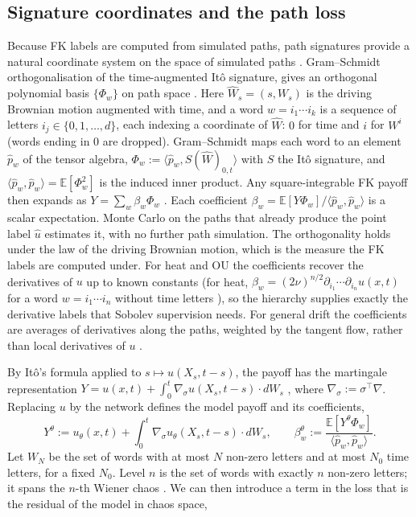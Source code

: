\documentclass[english]{article}
\begin{document}
\subsection{Signature coordinates and the path loss}\label{sec:sig}
Because FK labels are computed from simulated paths, path signatures provide a natural coordinate system on the space of simulated paths \cite{chevyrev2016primer,lyons2024signature}. Gram--Schmidt orthogonalisation of the time-augmented It\^o signature, gives an orthogonal polynomial basis $\{\Phi_w\}$ on path space \cite{chevyrev2026orthogonal}. Here $\hat W_s = (s, W_s)$ is the driving Brownian motion augmented with time, and a word $w = i_1\cdots i_k$ is a sequence of letters $i_j\in\{0,1,\dots,d\}$, each indexing a coordinate of $\hat W$: $0$ for time and $i$ for $W^i$ (words ending in $0$ are dropped). Gram--Schmidt maps each word to an element $\hat p_w$ of the tensor algebra, $\Phi_w := \langle\hat p_w, S(\hat W)_{0,t}\rangle$ with $S$ the It\^o signature, and $\langle\hat p_w,\hat p_w\rangle = \mathbb E[\Phi_w^2]$ is the induced inner product. Any square-integrable FK payoff then expands as $Y = \sum_w \beta_w \Phi_w$ \cite{chevyrev2026orthogonal,nualart2006malliavin}. Each coefficient $\beta_w = \mathbb{E}[Y\Phi_w]/\langle \hat p_w, \hat p_w\rangle$ is a scalar expectation. Monte Carlo on the paths that already produce the point label $\hat u$ estimates it, with no further path simulation. The orthogonality holds under the law of the driving Brownian motion, which is the measure the FK labels are computed under. For heat and OU the coefficients recover the derivatives of $u$ up to known constants (for heat, $\beta_w = (2\nu)^{n/2}\partial_{i_1}\cdots\partial_{i_n}u(x,t)$ for a word $w=i_1\cdots i_n$ without time letters \cite{stroock1987homogeneous}), so the hierarchy supplies exactly the derivative labels that Sobolev supervision needs. For general drift the coefficients are averages of derivatives along the paths, weighted by the tangent flow, rather than local derivatives of $u$ \cite{fournie1999applications}.

By It\^o's formula applied to $s\mapsto u(X_s,t-s)$, the payoff has the martingale representation $Y = u(x,t) + \int_0^t\nabla_\sigma u(X_s,t-s)\cdot dW_s$ \cite{pardoux1990adapted}, where $\nabla_\sigma := \sigma^\top\nabla$. Replacing $u$ by the network defines the model payoff and its coefficients,
\begin{equation}\label{eq:ytheta}
  Y^\theta := u_\theta(x,t) + \int_0^t\nabla_\sigma u_\theta(X_s,t-s)\cdot dW_s,
  \qquad
  \beta^\theta_w := \frac{\mathbb E[Y^\theta\Phi_w]}{\langle\hat p_w,\hat p_w\rangle}.
\end{equation}
Let $W_N$ be the set of words with at most $N$ non-zero letters and at most $N_0$ time letters, for a fixed $N_0$. Level $n$ is the set of words with exactly $n$ non-zero letters; it spans the $n$-th Wiener chaos \cite{chevyrev2026orthogonal}. We can then introduce a term in the loss that is the residual of the model in chaos space,
\end{document}
